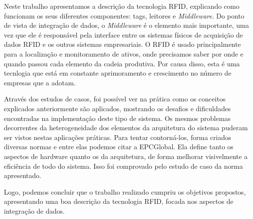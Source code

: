 

%

Neste trabalho apresentamos a descrição da tecnologia RFID, explicando como funcionam os seus diferentes componentes: tags, leitores e \textit{Middleware}. Do ponto de vista de integração de dados, o \textit{Middleware} é o elemento mais importante, uma vez que ele é responsável pela interface entre os sistemas físicos de acquisição de dados RFID e os outros sistemas empresariais. O RFID é usado principalmente para a localização e monitoramento de ativos, onde precisamos saber por onde e quando passou cada elemento da cadeia produtiva. Por causa disso, esta é uma tecnlogia que está em constante aprimoramento e crescimento no número de empresas que a adotam.

Através dos estudos de casos, foi possível ver na prática como os conceitos explicados anteriormente são aplicados, mostrando os desafios e dificuldades encontradas na implementação deste tipo de sistema. Os mesmos problemas decorrentes da heterogeneidade dos elementos da arquitetura do sistema puderam ser vistos nestas aplicações práticas. Para tentar contorná-los, forma criados diversas normas e entre elas podemos citar a EPCGlobal. Ela define tanto os aspectos de hardware quanto os da arquitetura, de forma melhorar visivelmente a eficiência de todo do sistema. Isso foi comprovado pelo estudo de caso da norma apresentado.

Logo, podemos concluir que o trabalho realizado cumpriu os objetivos propostos, apresentando uma boa descrição da tecnologia RFID, focada nos aspectos de integração de dados.  

 
%